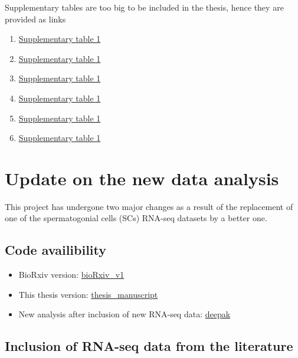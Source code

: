 \documentclass[12pt,twoside]{reedthesis}
\providecommand{\tightlist}{%
  \setlength{\itemsep}{0pt}\setlength{\parskip}{0pt}}
\begin{document}
Supplementary tables are too big to be included in the thesis, hence they are provided as links
\begin{enumerate}
\def\labelenumi{\arabic{enumi}.}
\tightlist
\item
  \href{../../figures/dev/t1.xlsx}{Supplementary table 1}
\item
  \href{../../figures/dev/t2.xlsx}{Supplementary table 1}
\item
  \href{../../figures/dev/t3.xlsx}{Supplementary table 1}
\item
  \href{../../figures/dev/t4.xlsx}{Supplementary table 1}
\item
  \href{../../figures/dev/t5.xlsx}{Supplementary table 1}
\item
  \href{../../figures/dev/t6.xlsx}{Supplementary table 1}
\end{enumerate}
\newpage

\hypertarget{update-on-the-new-data-analysis}{%
\section{Update on the new data analysis}\label{update-on-the-new-data-analysis}}

This project has undergone two major changes as a result of the
replacement of one of the spermatogonial cells (SCs) RNA-seq datasets by
a better one.

\hypertarget{code-availibility}{%
\subsection{Code availibility}\label{code-availibility}}
\begin{itemize}
\item
  BioRxiv version:
  \href{https://github.com/mansuylab/SC_postnatal_adult/tree/bioRxiv_v1}{bioRxiv\_v1}
\item
  This thesis version:
  \href{https://github.com/mansuylab/SC_postnatal_adult/tree/thesis_manuscript}{thesis\_manuscript}
\item
  New analysis after inclusion of new RNA-seq data:
  \href{https://github.com/mansuylab/SC_postnatal_adult/tree/deepak}{deepak}
\end{itemize}
\hypertarget{inclusion-of-rna-seq-data-from-the-literature}{%
\subsection{Inclusion of RNA-seq data from the literature}\label{inclusion-of-rna-seq-data-from-the-literature}}
\end{document}
